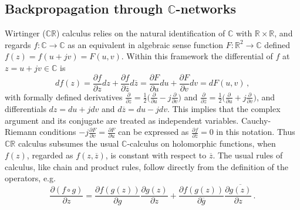 \documentclass[a4paper,10pt]{article}
\newcommand{\real}{\mathbb{R}}
\newcommand{\cplx}{\mathbb{C}}
\newcommand{\conj}[1]{\overline{#1}}
\begin{document}

\subsection{Backpropagation through $\cplx$-networks} %
\label{sub:wirtinger_calculus}

Wirtinger ($\cplx\real$) calculus relies on the natural identification of $\cplx$ with $
  \real \times \real
$, and regards $
  f\colon \cplx \to \cplx
$ as an equivalent in algebraic sense function $F\colon \real^2 \to \cplx$ defined $
  f(z) = f(u + jv) = F(u, v)
$. Within this framework the differential of $f$ at $z = u + jv \in \cplx$ is
$$
df(z)
  = \frac{\partial f}{\partial z} dz
    + \frac{\partial f}{\partial \conj{z}} d\conj{z}
   = \frac{\partial F}{\partial u} du
     + \frac{\partial F}{\partial v} dv
   = dF(u, v)
  \,, $$
with formally defined derivatives $
  \tfrac{\partial}{\partial z}
    = \tfrac12 \bigl(
      \tfrac{\partial}{\partial u}
      - j \tfrac{\partial}{\partial v}
    \bigr)
$ and $
  \tfrac{\partial}{\partial \conj{z}}
    = \tfrac12 \bigl(
      \tfrac{\partial}{\partial u}
      + j \tfrac{\partial}{\partial v}
    \bigr)
$, and differentials $dz = du + j dv$ and $d\conj{z} = du - j dv$. This implies that the
complex argument and its conjugate are treated as independent variables. Cauchy-Riemann
conditions $
  -j \tfrac{\partial F}{\partial v} = \tfrac{\partial F}{\partial u}
$ can be expressed as $
  \tfrac{\partial f}{\partial \conj{z}} = 0
$ in this notation. Thus $\cplx\real$ calculus subsumes the usual $\cplx$-calculus on
holomorphic functions, when $f(z)$, regarded as $f(z, \conj{z})$, is constant with respect
to $\conj{z}$. The usual rules of calculus, like chain and product rules, follow directly
from the definition of the operators, e.g.
$$
  \frac{\partial (f\circ g)}{\partial z}
    = \frac{\partial f(g(z))}{\partial g} \frac{\partial g(z)}{\partial z}
    + \frac{\partial f(g(z))}{\partial \conj{g}} \frac{\partial \conj{g(z)}}{\partial z}
  \,. $$
\end{document}
